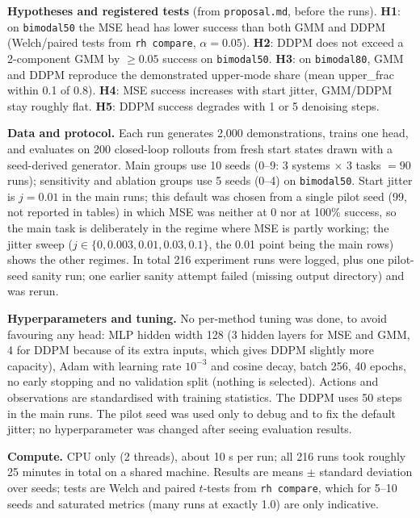 \textbf{Hypotheses and registered tests} (from \texttt{proposal.md}, before the runs). \textbf{H1}: on \texttt{bimodal50} the MSE head has lower success than both GMM and DDPM (Welch/paired tests from \texttt{rh compare}, $\alpha=0.05$). \textbf{H2}: DDPM does not exceed a 2-component GMM by $\ge0.05$ success on \texttt{bimodal50}. \textbf{H3}: on \texttt{bimodal80}, GMM and DDPM reproduce the demonstrated upper-mode share (mean upper\_frac within 0.1 of 0.8). \textbf{H4}: MSE success increases with start jitter, GMM/DDPM stay roughly flat. \textbf{H5}: DDPM success degrades with 1 or 5 denoising steps.

\textbf{Data and protocol.} Each run generates 2,000 demonstrations, trains one head, and evaluates on 200 closed-loop rollouts from fresh start states drawn with a seed-derived generator. Main groups use 10 seeds (0--9: 3 systems $\times$ 3 tasks $=90$ runs); sensitivity and ablation groups use 5 seeds (0--4) on \texttt{bimodal50}. Start jitter is $j=0.01$ in the main runs; this default was chosen from a single pilot seed (99, not reported in tables) in which MSE was neither at 0 nor at 100\% success, so the main task is deliberately in the regime where MSE is partly working; the jitter sweep ($j\in\{0,0.003,0.01,0.03,0.1\}$, the 0.01 point being the main rows) shows the other regimes. In total 216 experiment runs were logged, plus one pilot-seed sanity run; one earlier sanity attempt failed (missing output directory) and was rerun.

\textbf{Hyperparameters and tuning.} No per-method tuning was done, to avoid favouring any head: MLP hidden width 128 (3 hidden layers for MSE and GMM, 4 for DDPM because of its extra inputs, which gives DDPM slightly more capacity), Adam with learning rate $10^{-3}$ and cosine decay, batch 256, 40 epochs, no early stopping and no validation split (nothing is selected). Actions and observations are standardised with training statistics. The DDPM uses 50 steps in the main runs. The pilot seed was used only to debug and to fix the default jitter; no hyperparameter was changed after seeing evaluation results.

\textbf{Compute.} CPU only (2 threads), about 10 s per run; all 216 runs took roughly 25 minutes in total on a shared machine. Results are means $\pm$ standard deviation over seeds; tests are Welch and paired $t$-tests from \texttt{rh compare}, which for 5--10 seeds and saturated metrics (many runs at exactly 1.0) are only indicative.
